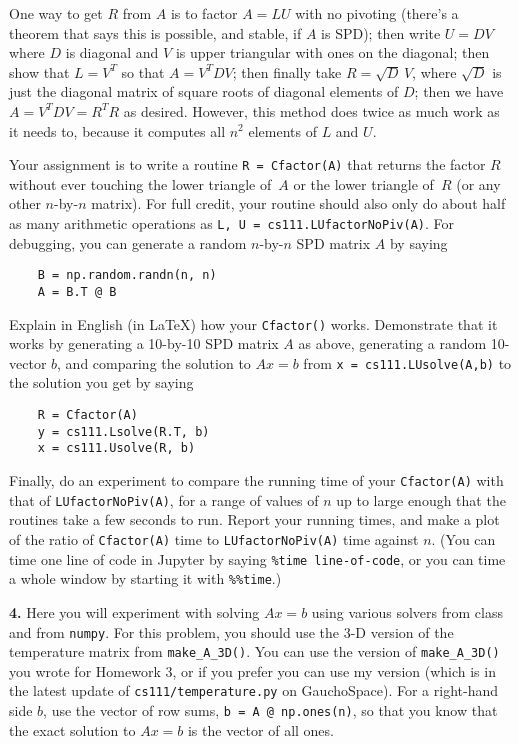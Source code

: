 \documentclass[11pt]{article}
\begin{document}
One way to get $R$ from $A$ is to factor $A=LU$ with no pivoting 
(there's a theorem that says this is possible, and stable, if $A$ is SPD);
then write $U = DV$ where $D$ is diagonal and $V$ is upper triangular with
ones on the diagonal; then show that $L=V^T$ so that $A=V^TDV$; 
then finally take $R=\sqrt D\, V$, where $\sqrt D$ is just the diagonal matrix
of square roots of diagonal elements of $D$; 
then we have $A=V^TDV=R^TR$ as desired.
However, this method does twice as much work as it needs to, 
because it computes all $n^2$ elements of $L$ and $U$.

Your assignment is to write a routine {\tt R = Cfactor(A)} that returns the 
factor $R$ without ever touching the lower triangle of~$A$ or the lower
triangle of~$R$ (or any other $n$-by-$n$ matrix).
For full credit, your routine should also only do about half as many
arithmetic operations as {\tt L, U = cs111.LUfactorNoPiv(A)}.
For debugging, you can generate a random $n$-by-$n$ SPD matrix $A$ by saying
\begin{verbatim}
    B = np.random.randn(n, n)
    A = B.T @ B
\end{verbatim}
Explain in English (in LaTeX) how your {\tt Cfactor()} works.
Demonstrate that it works by generating a 10-by-10 SPD matrix $A$ as above,
generating a random 10-vector $b$, and comparing the solution to $Ax=b$
from {\tt x = cs111.LUsolve(A,b)} to the solution you get by saying
\begin{verbatim}
    R = Cfactor(A)
    y = cs111.Lsolve(R.T, b)
    x = cs111.Usolve(R, b)
\end{verbatim}
Finally, do an experiment to compare the running time of your {\tt Cfactor(A)}
with that of {\tt LUfactorNoPiv(A)}, for a range of values of $n$ up to large
enough that the routines take a few seconds to run. Report your running times,
and make a plot of the ratio of 
{\tt Cfactor(A)} time to {\tt LUfactorNoPiv(A)} time against $n$.
(You can time one line of code in Jupyter by saying {\tt \%time line-of-code}, 
or you can time a whole window by starting it with {\tt \%\%time}.)

\par\bigskip
{\bf 4.} 
Here you will experiment with solving $Ax=b$ using various solvers
from class and from {\tt numpy}.
For this problem, you should use the 3-D version of the temperature matrix
from {\tt make\_A\_3D()}.
You can use the version of {\tt make\_A\_3D()}
you wrote for Homework 3, or if you prefer you can use 
my version (which is in the latest update of {\tt cs111/temperature.py} on GauchoSpace).
For a right-hand side $b$, use the vector of row sums, {\tt b = A @ np.ones(n)},
so that you know that the exact solution to $Ax=b$ is the vector of all ones.
\end{document}
